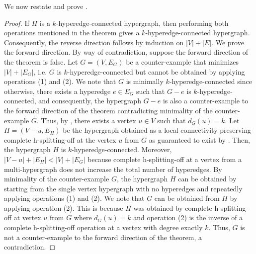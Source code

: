 We now restate and prove . 

\thmConstructiveCharacterization*
\begin{proof}%
    If $H$ is a $k$-hyperedge-connected hypergraph, then performing both operations mentioned in the theorem gives a $k$-hyperedge-connected hypergraph. Consequently, the reverse direction follows by induction on $|V| + |E|$. We prove the forward direction.  By way of contradiction, suppose the forward direction of the theorem is false. Let $G = (V, E_G)$ be a counter-example that minimizes $|V| + |E_G|$, i.e. $G$ is $k$-hyperedge-connected but cannot be obtained by applying operations (1) and (2). We note that $G$ is minimally $k$-hyperedge-connected since otherwise, there exists a hyperedge $e \in E_G$ such that $G - e$ is $k$-hyperedge-connected, and consequently, the hypergraph $G - e$ is also a counter-example to the forward direction of the theorem contradicting minimality of the counter-example $G$. Thus, by , there exists a vertex $u \in V$ such that $d_G(u) = k$. Let $H = (V - u, E_H)$ be the hypergraph obtained as a local connectivity preserving complete h-splitting-off at the vertex $u$ from $G$ as guaranteed to exist by . Then, the hypergraph $H$ is $k$-hyperedge-connected. Moreover, $|V-u| + |E_H| < |V| + |E_G|$ because complete h-splitting-off at a vertex from a multi-hypergraph does not increase the total number of hyperedges. 
    By minimality of the counter-example $G$, the hypergraph $H$ can be obtained by starting from the single vertex hypergraph with no hyperedges and repeatedly applying operations (1) and (2). 
    We note that $G$ can be obtained from $H$ by applying operation (2). This is because $H$ was obtained by complete h-splitting-off at vertex $u$ from $G$ where $d_G(u)=k$ and operation (2) is the inverse of a complete h-splitting-off operation at a vertex with degree exactly $k$. 
    Thus, $G$ is not a counter-example to the forward direction of the theorem, a contradiction.
\end{proof}

